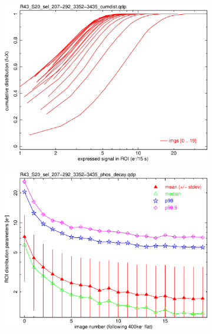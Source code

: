 \begin{figure}[!htbp]
\begin{subfigure}{0.45\textwidth}    
  \centering
  \includegraphics[width=\textwidth]{figures/phosphorescence-survey/phos_kinetics/R43_S20_sel_207-292_3352-3435_cumdist.png}    
\end{subfigure}
\hfil
\begin{subfigure}{0.45\textwidth}
  \centering
  \includegraphics[width=\textwidth]{figures/phosphorescence-survey/phos_kinetics/R43_S20_sel_207-292_3352-3435_phos_decay.png}
\end{subfigure}
\newline
\begin{subfigure}{0.45\textwidth}    

\end{subfigure}
\end{figure}

